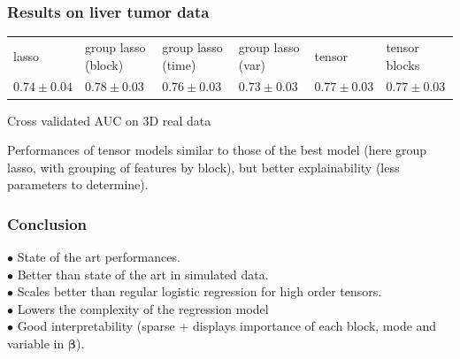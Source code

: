 \documentclass{beamer}
\begin{document}
\begin{frame}
    \frametitle{Results on liver tumor data}
    \begin{table}[H]
        \centering
        \label{tab:result_real}
        \renewcommand{\arraystretch}{1.2} 
        \begin{adjustbox}{center}
        \begin{tabular}{|>{\centering\arraybackslash}m{1.1cm}|>{\centering\arraybackslash}m{1.8cm}|>{\centering\arraybackslash}m{1.8cm}|>{\centering\arraybackslash}m{1.8cm}|>{\centering\arraybackslash}m{1.1cm}|>{\centering\arraybackslash}m{1.1cm}|}
            \cline{1-6}
             lasso & group lasso (block) & group lasso (time)& group lasso (var) & tensor & tensor blocks\\
            \cline{1-6} 
             $0.74 \pm 0.04$& $0.78 \pm 0.03$ & $0.76 \pm 0.03$ & $0.73 \pm 0.03$ & $0.77 \pm 0.03$ & $0.77 \pm 0.03$ \\
            \cline{1-6}
        \end{tabular}
        
    \end{adjustbox}
    \parbox{0.9\textwidth}{
    \vspace{0.2 cm}    
    \centering \small Cross validated AUC on 3D real data}
    \vspace{0.3 cm}
    \end{table}

    Performances of tensor models similar to those of the best model (here group lasso, with grouping of features by block), but better explainability (less parameters to determine).
\end{frame}

\begin{frame}
    \frametitle{Conclusion}
    $\bullet$ State of the art performances.\\[15 pt]
    $\bullet$ Better than state of the art in simulated data.\\[15 pt]
    $\bullet$ Scales better than regular logistic regression for high order tensors.\\[15 pt]
    $\bullet$ Lowers the complexity of the regression model \\[15 pt]
    $\bullet$ Good interpretability (sparse + displays importance of each block, mode and variable in $\bm{\beta}$).

\end{frame}

\end{document}
